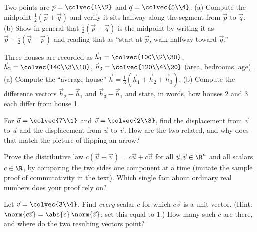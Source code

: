 \begin{exercise}
\label{ch02:exr-midpoint}
Two points are $\vec{p}=\colvec{1\\2}$ and $\vec{q}=\colvec{5\\4}$.
(a) Compute the midpoint $\tfrac12(\vec{p}+\vec{q})$ and verify it sits halfway along the
segment from $\vec{p}$ to $\vec{q}$.
(b) Show in general that $\tfrac12(\vec{p}+\vec{q})$ is the midpoint by writing it as
$\vec{p} + \tfrac12(\vec{q}-\vec{p})$ and reading that as ``start at $\vec{p}$, walk
halfway toward $\vec{q}$.''
\end{exercise}

\begin{exercise}
\label{ch02:exr-data}
Three houses are recorded as $\vec{h}_1=\colvec{100\\2\\30}$,
$\vec{h}_2=\colvec{140\\3\\10}$, $\vec{h}_3=\colvec{120\\4\\20}$ (area, bedrooms, age).
(a) Compute the ``average house'' $\bar{\vec{h}}=\tfrac13(\vec{h}_1+\vec{h}_2+\vec{h}_3)$.
(b) Compute the difference vectors $\vec{h}_2-\vec{h}_1$ and $\vec{h}_3-\vec{h}_1$ and
state, in words, how houses 2 and 3 each differ from house 1.
\end{exercise}

\begin{exercise}
\label{ch02:exr-displacement}
For $\vec{u}=\colvec{7\\1}$ and $\vec{v}=\colvec{2\\3}$, find the displacement from
$\vec{v}$ to $\vec{u}$ and the displacement from $\vec{u}$ to $\vec{v}$. How are the two
related, and why does that match the picture of flipping an arrow?
\end{exercise}

\begin{exercise}
\label{ch02:exr-proof}
Prove the distributive law $c(\vec{u}+\vec{v}) = c\vec{u} + c\vec{v}$ for all
$\vec{u},\vec{v}\in\R^n$ and all scalars $c\in\R$, by comparing the two sides one
component at a time (imitate the sample proof of commutativity in the text). Which single
fact about ordinary real numbers does your proof rely on?
\end{exercise}

\begin{exercise}
\label{ch02:exr-challenge}
Let $\vec{v}=\colvec{3\\4}$. Find \emph{every} scalar $c$ for which $c\vec{v}$ is a unit
vector. (Hint: $\norm{c\vec{v}} = \abs{c}\,\norm{\vec{v}}$; set this equal to $1$.) How
many such $c$ are there, and where do the two resulting vectors point?
\end{exercise}

